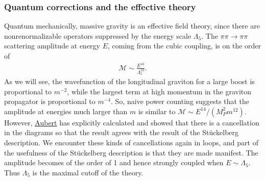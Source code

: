 \documentclass{book}
\theoremstyle{definition}
\newcommand{\f}[2]{\frac{#1}{#2}}
\begin{document}
\newpage
\subsubsection{Quantum corrections and the effective theory}

Quantum mechanically, massive gravity is an effective field theory, since there are nonrenormalizable operators suppressed by the energy scale $\Lambda_5$. The $\pi \pi \to \pi \pi$ scattering amplitude at energy $E$, coming from the cubic coupling, is on the order of 
\begin{align}
\mathcal{M} \sim \f{E^{10}}{\Lambda_5^{10}}.
\end{align}
As we will see, the wavefunction of the longitudinal graviton for a large boost is proportional to $m^{-2}$, while the largest term at high momentum in the graviton propagator is proportional to $m^{-4}$. So, naive power counting suggests that the amplitude at energies much larger than $m$ is similar to $\mathcal{M} \sim E^{14} / (M_P^2 m^{12})$. However, \href{https://arxiv.org/pdf/hep-th/0312246.pdf}{\underline{Aubert}} has explicitly calculated and showed that there is a cancellation in the diagrams so that the result agrees with the result of the St\"{u}ckelberg description. We encounter these kinds of cancellations again in loops, and part of the usefulness of the St\"{u}ckelberg description is that they are made manifest. The amplitude becomes of the order of 1 and hence strongly coupled when $E \sim \Lambda_5$. Thus $\Lambda_5$ is the maximal cutoff of the theory.\\
\end{document}

